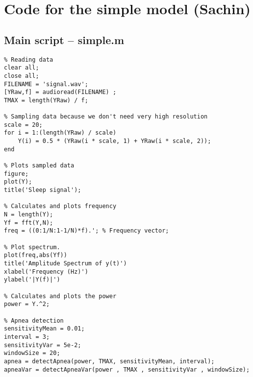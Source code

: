 \chapter{Code for the simple model (Sachin)}
\label{ch:simpleCode}

\section{Main script -- simple.m}
\label{sec:simple}
\begin{lstlisting}
% Reading data
clear all;
close all;
FILENAME = 'signal.wav';
[YRaw,f] = audioread(FILENAME) ;
TMAX = length(YRaw) / f;

% Sampling data because we don't need very high resolution
scale = 20;
for i = 1:(length(YRaw) / scale)
    Y(i) = 0.5 * (YRaw(i * scale, 1) + YRaw(i * scale, 2));
end

% Plots sampled data
figure;
plot(Y);
title('Sleep signal');

% Calculates and plots frequency
N = length(Y);
Yf = fft(Y,N);
freq = ((0:1/N:1-1/N)*f).'; % Frequency vector;

% Plot spectrum.
plot(freq,abs(Yf)) 
title('Amplitude Spectrum of y(t)')
xlabel('Frequency (Hz)')
ylabel('|Y(f)|')

% Calculates and plots the power
power = Y.^2;

% Apnea detection
sensitivityMean = 0.01;
interval = 3;
sensitivityVar = 5e-2;
windowSize = 20;
apnea = detectApnea(power, TMAX, sensitivityMean, interval);
apneaVar = detectApneaVar(power , TMAX , sensitivityVar , windowSize);
\end{lstlisting}

